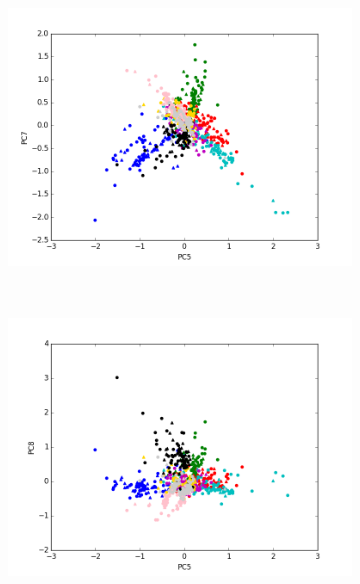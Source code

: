\begin{figure}[ht!]	
	\begin{subfigure}[b]{0.5\textwidth}
		\includegraphics[width=\linewidth]{img/sanger/9dim-pc5-pc7.png}
	\end{subfigure}%
	~
	\begin{subfigure}[b]{0.5\textwidth}
		\includegraphics[width=\linewidth]{img/sanger/9dim-pc5-pc8.png}
	\end{subfigure}%

\end{figure}

